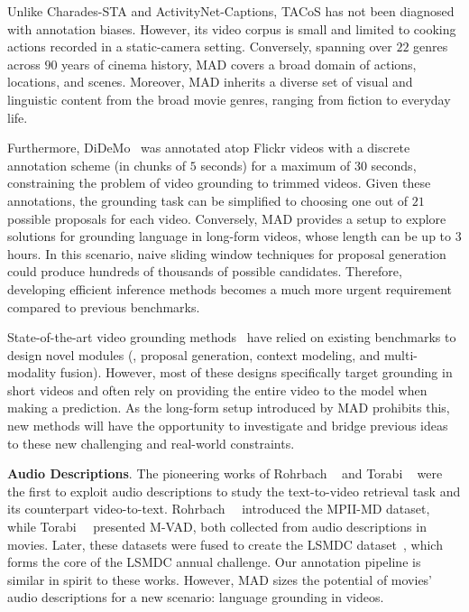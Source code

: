 \documentclass[10pt,twocolumn,letterpaper]{article}
\begin{document}
Unlike Charades-STA and ActivityNet-Captions, TACoS \cite{TACoS_ACL_2013} has not been diagnosed with annotation biases. However, its video corpus is small and limited to cooking actions recorded in a static-camera setting. Conversely, spanning over $22$ genres across $90$ years of cinema history, MAD covers a broad domain of actions, locations, and scenes. 
Moreover, MAD inherits a diverse set of visual and linguistic content from the broad movie genres, ranging from fiction to everyday life.

Furthermore, DiDeMo~\cite{Hendricks_2017_ICCV} was annotated atop Flickr videos with a discrete annotation scheme (\ie in chunks of $5$ seconds) for a maximum of $30$ seconds, constraining the problem of video grounding to trimmed videos. Given these annotations, the grounding task can be simplified to choosing one out of $21$ possible proposals for each video. 
Conversely, MAD provides a setup to explore solutions for grounding language in long-form videos, whose length can be up to $3$ hours.  
In this scenario, naive sliding window techniques for proposal generation could produce  hundreds of thousands of possible  candidates. Therefore, developing efficient inference methods becomes a much more urgent requirement compared to previous benchmarks.

State-of-the-art video grounding methods~\cite{2DTAN_2020_AAAI, soldan2021vlg, liu2020jointly, Zeng_2020_CVPR, Mun_2020_CVPR,Zhao_2021_CVPR,Liu_2021_CVPR} have relied on existing benchmarks to design novel modules (\ie, proposal generation, context modeling, and multi-modality fusion). However, most of these designs specifically target grounding in short videos and often rely on providing the entire video to the model when making a prediction. As the long-form setup introduced by MAD prohibits this, new methods will have the opportunity to investigate and bridge previous ideas to these new challenging and real-world  constraints.  


\noindent\textbf{Audio Descriptions}.
The pioneering works of Rohrbach \etal~\cite{rohrbach2015dataset} and Torabi \etal~\cite{torabi2015using} were the first to exploit audio descriptions to study the text-to-video retrieval task and its counterpart video-to-text. 
Rohrbach~\etal~\cite{rohrbach2015dataset} introduced the MPII-MD dataset, while Torabi~\etal~\cite{torabi2015using} presented M-VAD, both collected from audio descriptions in movies. Later, these datasets were fused to create the LSMDC dataset~\cite{rohrbach2017movie}, which forms the core of the LSMDC annual challenge. Our annotation pipeline is similar in spirit to these works. However, MAD sizes the potential of movies' audio descriptions for a new scenario: language grounding in videos.
\end{document}
